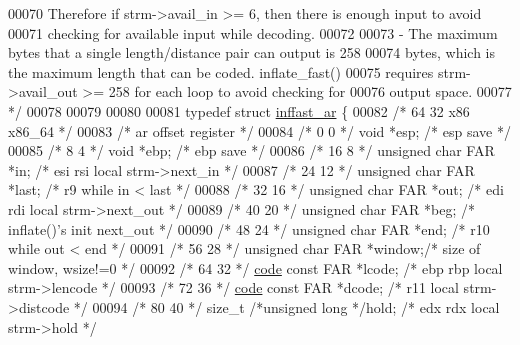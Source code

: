 \begin{DoxyCode}
{{00070 \textcolor{comment}{      Therefore if strm->avail\_in >= 6, then there is enough input to avoid}
00071 \textcolor{comment}{      checking for available input while decoding.}
00072 \textcolor{comment}{}
00073 \textcolor{comment}{    - The maximum bytes that a single length/distance pair can output is 258}
00074 \textcolor{comment}{      bytes, which is the maximum length that can be coded.  inflate\_fast()}
00075 \textcolor{comment}{      requires strm->avail\_out >= 258 for each loop to avoid checking for}
00076 \textcolor{comment}{      output space.}
00077 \textcolor{comment}{ */}
00078 
00079 
00080 
00081     \textcolor{keyword}{typedef} \textcolor{keyword}{struct }\hyperlink{structinffast__ar}{inffast\_ar} \{
00082 \textcolor{comment}{/* 64   32                               x86  x86\_64 */}
00083 \textcolor{comment}{/* ar offset                              register */}
00084 \textcolor{comment}{/*  0    0 */} \textcolor{keywordtype}{void} *esp;                \textcolor{comment}{/* esp save */}
00085 \textcolor{comment}{/*  8    4 */} \textcolor{keywordtype}{void} *ebp;                \textcolor{comment}{/* ebp save */}
00086 \textcolor{comment}{/* 16    8 */} \textcolor{keywordtype}{unsigned} \textcolor{keywordtype}{char} FAR *in;    \textcolor{comment}{/* esi rsi  local strm->next\_in */}
00087 \textcolor{comment}{/* 24   12 */} \textcolor{keywordtype}{unsigned} \textcolor{keywordtype}{char} FAR *last;  \textcolor{comment}{/*     r9   while in < last */}
00088 \textcolor{comment}{/* 32   16 */} \textcolor{keywordtype}{unsigned} \textcolor{keywordtype}{char} FAR *out;   \textcolor{comment}{/* edi rdi  local strm->next\_out */}
00089 \textcolor{comment}{/* 40   20 */} \textcolor{keywordtype}{unsigned} \textcolor{keywordtype}{char} FAR *beg;   \textcolor{comment}{/*          inflate()'s init next\_out */}
00090 \textcolor{comment}{/* 48   24 */} \textcolor{keywordtype}{unsigned} \textcolor{keywordtype}{char} FAR *end;   \textcolor{comment}{/*     r10  while out < end */}
00091 \textcolor{comment}{/* 56   28 */} \textcolor{keywordtype}{unsigned} \textcolor{keywordtype}{char} FAR *window;\textcolor{comment}{/*          size of window, wsize!=0 */}
00092 \textcolor{comment}{/* 64   32 */} \hyperlink{structcode}{code} \textcolor{keyword}{const} FAR *lcode;    \textcolor{comment}{/* ebp rbp  local strm->lencode */}
00093 \textcolor{comment}{/* 72   36 */} \hyperlink{structcode}{code} \textcolor{keyword}{const} FAR *dcode;    \textcolor{comment}{/*     r11  local strm->distcode */}
00094 \textcolor{comment}{/* 80   40 */} \textcolor{keywordtype}{size\_t} \textcolor{comment}{/*unsigned long */}hold;       \textcolor{comment}{/* edx rdx  local strm->hold */}
}}
\end{DoxyCode}
